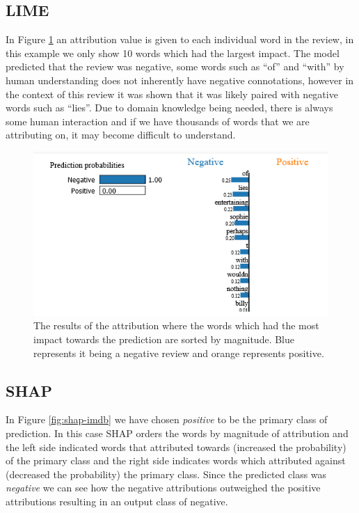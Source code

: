 \subsection{LIME}
In Figure \ref{fig:lime-imdb} an attribution value is given to each individual word in the review, in this example we only show 10 words which had the largest impact. The model predicted that the review was negative, some words such as ``of'' and ``with'' by human understanding does not inherently have negative connotations, however in the context of this review it was shown that it was likely paired with negative words such as ``lies''. Due to domain knowledge being needed, there is always some human interaction and if we have thousands of words that we are attributing on, it may become difficult to understand.
\begin  {figure}[!htpb]
  \includegraphics[width=\linewidth]{Evaluation_Images/IMDB_explanation_1.png}
  \caption{The results of the attribution where the words which had the most impact towards the prediction are sorted by magnitude. Blue represents it being a negative review and orange represents positive.}
  \label{fig:lime-imdb}
\end{figure}


\subsection{SHAP}
In Figure \ref{fig:shap-imdb} we have chosen \emph{positive} to be the primary class of prediction. In this case SHAP orders the words by magnitude of attribution and the left side indicated words that attributed towards (increased the probability) of the primary class and the right side indicates words which attributed against (decreased the probability) the primary class. Since the predicted class was \emph{negative} we can see how the negative attributions outweighed the positive attributions resulting in an output class of negative.

